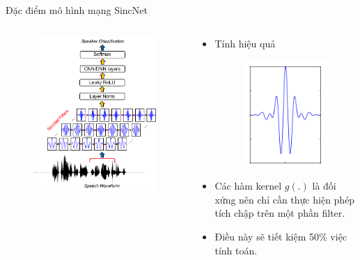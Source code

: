 \documentclass[11pt]{beamer}
\begin{document}
\begin{frame}{Đặc điểm mô hình mạng SincNet}
	\begin{columns}
		\begin{column}{0.47\textwidth}
			\begin{figure}[H]
				\includegraphics[width=0.9\linewidth]{images/SincNet.png}
			\end{figure}
		\end{column}
		\begin{column}{0.5\textwidth}
			\begin{itemize}
				\item Tính hiệu quả
				\begin{figure}[H]
					\includegraphics[width=0.45\linewidth]{images/g_symmetric.png}
				\end{figure}
				\item 	Các hàm kernel $g(.)$ là đối xứng nên chỉ cần thực hiện phép tích chập trên một phần filter. 
				\item Điều này sẽ tiết kiệm 50\% việc tính toán.
			\end{itemize}
		\end{column}
	\end{columns}
\end{frame}
\end{document}
